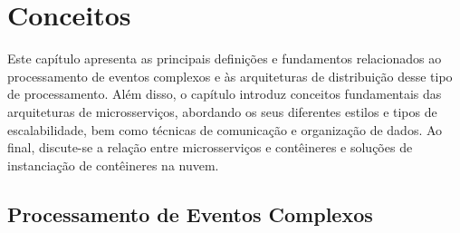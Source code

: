 \chapter{Conceitos}
\label{cap:conceitos}

%







Este capítulo apresenta as principais definições e fundamentos relacionados ao processamento de eventos complexos e às arquiteturas de distribuição desse tipo de processamento. Além disso, o capítulo introduz conceitos fundamentais das arquiteturas de microsserviços, 
abordando os seus diferentes estilos e tipos de escalabilidade, bem como técnicas de comunicação e organização de dados. Ao final, discute-se a relação entre microsserviços e contêineres e soluções de instanciação de contêineres na nuvem.%

\section{Processamento de Eventos Complexos}
\label{sec:cep}

